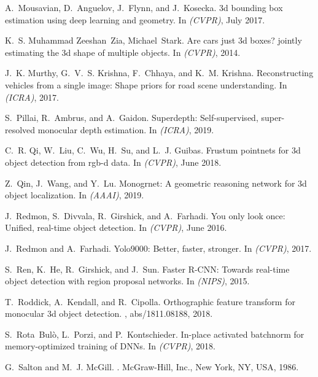 \documentclass[10pt,twocolumn,letterpaper]{article}
\begin{document}
{\begin{thebibliography}{10}
A.~Mousavian, D.~Anguelov, J.~Flynn, and J.~Kosecka.
\newblock 3d bounding box estimation using deep learning and geometry.
\newblock In {\em (CVPR)}, July 2017.

K.~S. Muhammad Zeeshan~Zia, Michael~Stark.
\newblock Are cars just 3d boxes? jointly estimating the 3d shape of multiple
  objects.
\newblock In {\em (CVPR)}, 2014.

J.~K. {Murthy}, G.~V.~S. {Krishna}, F.~{Chhaya}, and K.~M. {Krishna}.
\newblock Reconstructing vehicles from a single image: Shape priors for road
  scene understanding.
\newblock In {\em (ICRA)}, 2017.

S.~Pillai, R.~Ambrus, and A.~Gaidon.
\newblock Superdepth: Self-supervised, super-resolved monocular depth
  estimation.
\newblock In {\em (ICRA)}, 2019.

C.~R. Qi, W.~Liu, C.~Wu, H.~Su, and L.~J. Guibas.
\newblock Frustum pointnets for 3d object detection from rgb-d data.
\newblock In {\em (CVPR)}, June 2018.

Z.~Qin, J.~Wang, and Y.~Lu.
\newblock Monogrnet: A geometric reasoning network for 3d object localization.
\newblock In {\em (AAAI)}, 2019.

J.~Redmon, S.~Divvala, R.~Girshick, and A.~Farhadi.
\newblock You only look once: Unified, real-time object detection.
\newblock In {\em (CVPR)}, June 2016.

J.~Redmon and A.~Farhadi.
\newblock Yolo9000: Better, faster, stronger.
\newblock In {\em (CVPR)}, 2017.

S.~Ren, K.~He, R.~Girshick, and J.~Sun.
\newblock Faster {R-CNN}: Towards real-time object detection with region
  proposal networks.
\newblock In {\em (NIPS)}, 2015.

T.~Roddick, A.~Kendall, and R.~Cipolla.
\newblock Orthographic feature transform for monocular 3d object detection.
, abs/1811.08188, 2018.

S.~Rota~Bul\`o, L.~Porzi, and P.~Kontschieder.
\newblock In-place activated batchnorm for memory-optimized training of {DNN}s.
\newblock In {\em (CVPR)}, 2018.

G.~Salton and M.~J. McGill.
.
\newblock McGraw-Hill, Inc., New York, NY, USA, 1986.


\end{thebibliography}}
\end{document}
